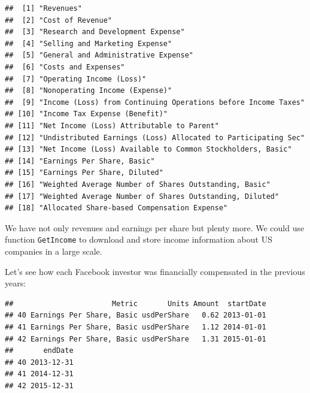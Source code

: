 \documentclass[11pt,]{book}
\newenvironment{Shaded}{\begin{snugshade}}{\end{snugshade}}
\newcommand{\KeywordTok}[1]{\textcolor[rgb]{0.27,0.27,0.27}{\textbf{#1}}}
\newcommand{\StringTok}[1]{\textcolor[rgb]{0.5,0.5,0.5}{#1}}
\newcommand{\CommentTok}[1]{\textcolor[rgb]{0.56,0.35,0.01}{\textit{#1}}}
\newcommand{\OperatorTok}[1]{\textcolor[rgb]{0.81,0.36,0.00}{\textbf{#1}}}
\newcommand{\NormalTok}[1]{#1}
\begin{document}
\begin{verbatim}
##  [1] "Revenues"                                                    
##  [2] "Cost of Revenue"                                             
##  [3] "Research and Development Expense"                            
##  [4] "Selling and Marketing Expense"                               
##  [5] "General and Administrative Expense"                          
##  [6] "Costs and Expenses"                                          
##  [7] "Operating Income (Loss)"                                     
##  [8] "Nonoperating Income (Expense)"                               
##  [9] "Income (Loss) from Continuing Operations before Income Taxes"
## [10] "Income Tax Expense (Benefit)"                                
## [11] "Net Income (Loss) Attributable to Parent"                    
## [12] "Undistributed Earnings (Loss) Allocated to Participating Sec"
## [13] "Net Income (Loss) Available to Common Stockholders, Basic"   
## [14] "Earnings Per Share, Basic"                                   
## [15] "Earnings Per Share, Diluted"                                 
## [16] "Weighted Average Number of Shares Outstanding, Basic"        
## [17] "Weighted Average Number of Shares Outstanding, Diluted"      
## [18] "Allocated Share-based Compensation Expense"
\end{verbatim}

We have not only revenues and earnings per share but plenty more. We
could use function \texttt{GetIncome} to download and store income
information about US companies in a large scale.

Let's see how each Facebook investor was financially compensated in the
previous years:

\begin{Shaded}
\end{Shaded}

\begin{verbatim}
##                       Metric       Units Amount  startDate
## 40 Earnings Per Share, Basic usdPerShare   0.62 2013-01-01
## 41 Earnings Per Share, Basic usdPerShare   1.12 2014-01-01
## 42 Earnings Per Share, Basic usdPerShare   1.31 2015-01-01
##       endDate
## 40 2013-12-31
## 41 2014-12-31
## 42 2015-12-31
\end{verbatim}
\end{document}
